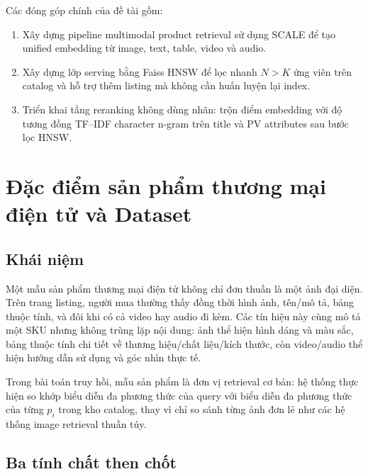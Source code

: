 \documentclass[10pt,conference]{IEEEtran}
\begin{document}
Các đóng góp chính của đề tài gồm:
\begin{enumerate}[leftmargin=*]
    \item Xây dựng pipeline multimodal product retrieval sử dụng SCALE để tạo unified embedding từ image, text, table, video và audio.
    \item Xây dựng lớp serving bằng Faiss HNSW để lọc nhanh $N>K$ ứng viên trên catalog và hỗ trợ thêm listing mà không cần huấn luyện lại index.
    \item Triển khai tầng reranking không dùng nhãn: trộn điểm embedding với độ tương đồng TF--IDF character n-gram trên title và PV attributes sau bước lọc HNSW.
\end{enumerate}

\section{Đặc điểm sản phẩm thương mại điện tử và Dataset}

\subsection{Khái niệm}
Một mẫu sản phẩm thương mại điện tử không chỉ đơn thuần là một ảnh đại diện. Trên trang listing, người mua thường thấy đồng thời hình ảnh, tên/mô tả, bảng thuộc tính, và đôi khi có cả video hay audio đi kèm. Các tín hiệu này cùng mô tả một SKU nhưng không trùng lặp nội dung: ảnh thể hiện hình dáng và màu sắc, bảng thuộc tính chi tiết về thương hiệu/chất liệu/kích thước, còn video/audio thể hiện hướng dẫn sử dụng và góc nhìn thực tế.

Trong bài toán truy hồi, mẫu sản phẩm là đơn vị retrieval cơ bản: hệ thống thực hiện so khớp biểu diễn đa phương thức của query với biểu diễn đa phương thức của từng $p_i$ trong kho catalog, thay vì chỉ so sánh từng ảnh đơn lẻ như các hệ thống image retrieval thuần túy.

\subsection{Ba tính chất then chốt}
\end{document}
